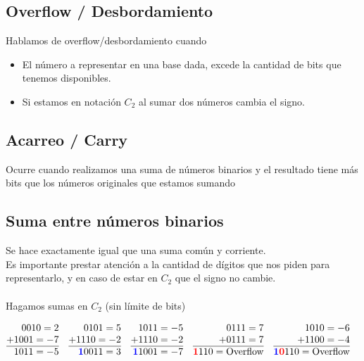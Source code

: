 \documentclass[10pt,a4paper]{article}
\begin{document}
\subsection*{Overflow / Desbordamiento}
Hablamos de overflow/desbordamiento cuando 
\begin{itemize}
    \item\label{item:overflow1} El número a representar en una base dada, excede la cantidad de bits que tenemos disponibles.
    \item\label{item:overflow2} Si estamos en notación \(C_{2}\) al sumar dos números cambia el signo.
\end{itemize} 


\subsection*{Acarreo / Carry}
Ocurre cuando realizamos una suma de números binarios y el resultado tiene más bits que los números originales que estamos sumando

\subsection*{Suma entre números binarios}
Se hace exactamente igual que una suma común y corriente. \\
Es importante prestar atención a la cantidad de dígitos que nos piden para representarlo, y en caso de estar en \(C_{2}\) que el signo no cambie.\\ 
\\
Hagamos sumas en \(C_{2}\) (sin límite de bits)

\begin{align*}
    &\begin{array}{@{} r@{}}
      0010 = 2 \\
    + 1001 = -7\\
    \hline
    \ 1011 = -5
    \end{array}
    &&
    \begin{array}{@{} r @{}}
       0101 = 5 \\
    + 1110 = -2 \\
    \hline
    \textcolor{blue}{\textbf{1}}0011 = 3
    \end{array}
    &&
    \begin{array}{@{} r @{}}
       1011 = -5 \\
    + 1110 = -2 \\
    \hline
    \textcolor{blue}{\textbf{1}}1001 = -7
    \end{array}
    &&
    \begin{array}{@{} r @{}}
       0111 = 7 \\
    + 0111 = 7\\
    \hline
    \textcolor{red}{\textbf{1}}110 = \text{Overflow}
    \end{array}
    &&
    \begin{array}{@{} r @{}}
       1010 = -6 \\
    + 1100 = -4 \\
    \hline
    \textcolor{blue}{\textbf{1}}\textcolor{red}{\textbf{0}}110 = \text{Overflow}
    \end{array}
    \end{align*}
\end{document}
